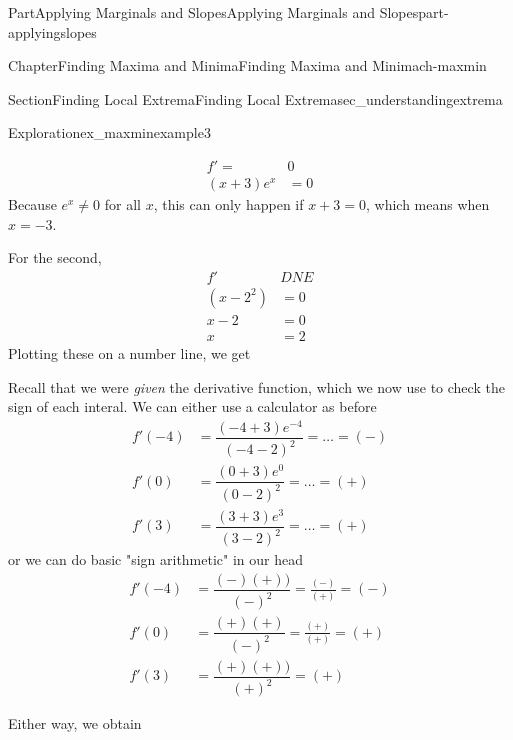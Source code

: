 \documentclass[oneside,10pt,]{tufte-book}
\numberwithin{equation}{chapter}
\newcommand{\amp}{&}
\begin{document}
\begin{partptx}{Part}{Applying Marginals and Slopes}{}{Applying Marginals and Slopes}{}{}{part-applyingslopes}
\begin{chapterptx}{Chapter}{Finding Maxima and Minima}{}{Finding Maxima and Minima}{}{}{ch-maxmin}
\begin{sectionptx}{Section}{Finding Local Extrema}{}{Finding Local Extrema}{}{}{sec_understandingextrema}
\begin{exploration}{Exploration}{}{ex_maxminexample3}
\begin{enumerate}[font=\bfseries,label=(\alph*),ref=\alph*]
\begin{align*}
f' = \amp 0\\
(x+3)e^x \amp =0
\end{align*}
Because \(e^x \neq 0\) for all \(x\), this can only happen if \(x+3=0\), which means when \(x=-3\).%
\par
For the second,%
\begin{align*}
f' \amp DNE \\
(x-2^2) \amp =0 \\
x-2 \amp =0\\
x \amp = 2
\end{align*}
Plotting these on a number line, we get \begin{image}{0}{1}{0}{}%
%
\end{image}%
%
\par
Recall that we were \emph{given} the derivative function, which we now use to check the sign of each interal. We can either use a calculator as before%
\begin{align*}
f'(-4) \amp  = \dfrac{(-4+3)e^{-4}}{(-4-2)^2} = \dots = (-)\\
f'(0) \amp = \dfrac{(0+3)e^0}{(0-2)^2} = \dots = (+)\\
f'(3) \amp = \dfrac{(3+3)e^3}{(3-2)^2} = \dots = (+)
\end{align*}
or we can do basic "sign arithmetic" in our head%
\begin{align*}
f'(-4) \amp  = \dfrac{(-)(+))}{(-)^2} = \frac{(-)}{(+)} =  (-)\\
f'(0) \amp = \dfrac{(+)(+)}{(-)^2} = \frac{(+)}{(+)} = (+)\\
f'(3) \amp = \dfrac{(+)(+))}{(+)^2} = (+)
\end{align*}
%
\par
Either way, we obtain \begin{image}{0}{1}{0}{}%
\end{image}
\end{enumerate}
\end{exploration}
\end{sectionptx}
\end{chapterptx}
\end{partptx}
\end{document}
